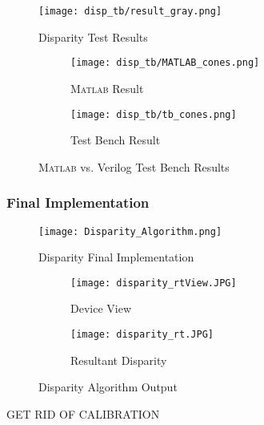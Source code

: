\begin{figure}[H]
	\centerline{\texttt{[image: disp\_tb/result\_gray.png]}}
	\caption{Disparity Test Results}
	\label{disparityTestResults}
\end{figure}

\begin{figure}[H]
	 \begin{subfigure}[h]{1.0\textwidth}
             \centerline{\texttt{[image: disp\_tb/MATLAB\_cones.png]}}
             \caption{\textsc{Matlab} Result}
			\label{disparityMatlabResult}
         \end{subfigure} 
         \begin{subfigure}[h]{1.0\textwidth}
              \centerline{\texttt{[image: disp\_tb/tb\_cones.png]}}
             \caption{Test Bench Result}
			\label{disparityVerilogResult}
         \end{subfigure}
\label{disparityVerilogvsMatlab}
\caption{\textsc{Matlab} vs. Verilog Test Bench Results}
\end{figure}


\subsubsection{Final Implementation}
\begin{figure}[H]
	\centerline{\texttt{[image: Disparity\_Algorithm.png]}}
	\caption{Disparity Final Implementation}
	\label{disparityTestImp}
\end{figure}
\par
\begin{figure}[H] 
	\begin{subfigure}{0.5\textwidth}
	\centering
		\texttt{[image: disparity\_rtView.JPG]}
		\caption{Device View}
	\end{subfigure}
	\begin{subfigure}{0.5\textwidth}
	\centering
		\texttt{[image: disparity\_rt.JPG]}
		\caption{Resultant Disparity}
	\end{subfigure}
	\caption{Disparity Algorithm Output}
	\label{disparityFin}
\end{figure}
\par
GET RID OF CALIBRATION 